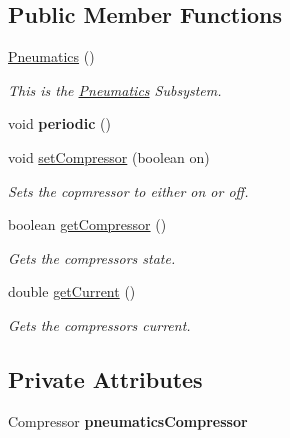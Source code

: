 \subsection*{Public Member Functions}
\begin{DoxyCompactItemize}
\item 
\mbox{\label{classfrc_1_1robot_1_1subsystems_1_1_pneumatics_acb6a83e96e00bfa11a18ba8589c642de}} 
\mbox{\hyperlink{classfrc_1_1robot_1_1subsystems_1_1_pneumatics_acb6a83e96e00bfa11a18ba8589c642de}{Pneumatics}} ()
\begin{DoxyCompactList}\small\item\em This is the \mbox{\hyperlink{classfrc_1_1robot_1_1subsystems_1_1_pneumatics}{Pneumatics}} Subsystem. \end{DoxyCompactList}\item 
\mbox{\label{classfrc_1_1robot_1_1subsystems_1_1_pneumatics_aee50e0a790a84ca1b7b86892378fe461}} 
void {\bfseries periodic} ()
\item 
void \mbox{\hyperlink{classfrc_1_1robot_1_1subsystems_1_1_pneumatics_aef8c19b99d585e228a4757afb94fd706}{set\+Compressor}} (boolean on)
\begin{DoxyCompactList}\small\item\em Sets the copmressor to either on or off. \end{DoxyCompactList}\item 
boolean \mbox{\hyperlink{classfrc_1_1robot_1_1subsystems_1_1_pneumatics_ab3d6132aa313d1eb19bb55655b28de48}{get\+Compressor}} ()
\begin{DoxyCompactList}\small\item\em Gets the compressor\textquotesingle{}s state. \end{DoxyCompactList}\item 
double \mbox{\hyperlink{classfrc_1_1robot_1_1subsystems_1_1_pneumatics_a7ba117b67fe54e1485b6745be2a85849}{get\+Current}} ()
\begin{DoxyCompactList}\small\item\em Gets the compressor\textquotesingle{}s current. \end{DoxyCompactList}\end{DoxyCompactItemize}
\subsection*{Private Attributes}
\begin{DoxyCompactItemize}
\item 
\mbox{\label{classfrc_1_1robot_1_1subsystems_1_1_pneumatics_afb216da0e84e0c0c12ef9ebe4b2ef949}} 
Compressor {\bfseries pneumatics\+Compressor}
\end{DoxyCompactItemize}


